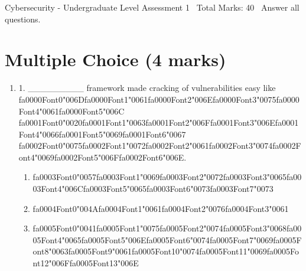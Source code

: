 \documentclass[12pt]{article}
\begin{document}
\begin{center}
Cybersecurity - Undergraduate Level Assessment 1 \
Total Marks: 40 \
Answer all questions.
\end{center}

\section*{Multiple Choice (4 marks)}
\begin{enumerate}[label=\arabic*.]
\item 1. \_\_\_\_\_\_\_\_\_ framework made cracking of vulnerabilities easy like {\csname fa0000Font0\endcsname\char"006D}{\csname fa0000Font1\endcsname\char"0061}{\csname fa0000Font2\endcsname\char"006E}{\csname fa0000Font3\endcsname\char"0075}{\csname fa0000Font4\endcsname\char"0061}{\csname fa0000Font5\endcsname\char"006C} {\csname fa0001Font0\endcsname\char"0020}{\csname fa0001Font1\endcsname\char"0063}{\csname fa0001Font2\endcsname\char"006F}{\csname fa0001Font3\endcsname\char"006E}{\csname fa0001Font4\endcsname\char"0066}{\csname fa0001Font5\endcsname\char"0069}{\csname fa0001Font6\endcsname\char"0067} {\csname fa0002Font0\endcsname\char"0075}{\csname fa0002Font1\endcsname\char"0072}{\csname fa0002Font2\endcsname\char"0061}{\csname fa0002Font3\endcsname\char"0074}{\csname fa0002Font4\endcsname\char"0069}{\csname fa0002Font5\endcsname\char"006F}{\csname fa0002Font6\endcsname\char"006E}.
\begin{enumerate}[label=(\alph*)]
    \item {\csname fa0003Font0\endcsname\char"0057}{\csname fa0003Font1\endcsname\char"0069}{\csname fa0003Font2\endcsname\char"0072}{\csname fa0003Font3\endcsname\char"0065}{\csname fa0003Font4\endcsname\char"006C}{\csname fa0003Font5\endcsname\char"0065}{\csname fa0003Font6\endcsname\char"0073}{\csname fa0003Font7\endcsname\char"0073}
    \item {\csname fa0004Font0\endcsname\char"004A}{\csname fa0004Font1\endcsname\char"0061}{\csname fa0004Font2\endcsname\char"0076}{\csname fa0004Font3\endcsname\char"0061}
    \item {\csname fa0005Font0\endcsname\char"0041}{\csname fa0005Font1\endcsname\char"0075}{\csname fa0005Font2\endcsname\char"0074}{\csname fa0005Font3\endcsname\char"0068}{\csname fa0005Font4\endcsname\char"0065}{\csname fa0005Font5\endcsname\char"006E}{\csname fa0005Font6\endcsname\char"0074}{\csname fa0005Font7\endcsname\char"0069}{\csname fa0005Font8\endcsname\char"0063}{\csname fa0005Font9\endcsname\char"0061}{\csname fa0005Font10\endcsname\char"0074}{\csname fa0005Font11\endcsname\char"0069}{\csname fa0005Font12\endcsname\char"006F}{\csname fa0005Font13\endcsname\char"006E}

\end{enumerate}
\end{enumerate}
\end{document}
